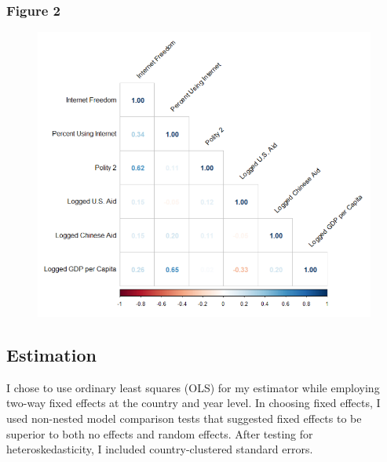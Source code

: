 \documentclass[12pt]{article}
\begin{document}
\subsubsection*{Figure 2}
\begin{figure}[htbp]
    \includegraphics[scale=0.7]{Figures/628plot3.png}
\end{figure}

\subsection*{Estimation}
I chose to use ordinary least squares (OLS) for my estimator while employing two-way fixed effects at the country and year level. In choosing fixed effects, I used non-nested model comparison tests that suggested fixed effects to be superior to both no effects and random effects. After testing for heteroskedasticity, I included country-clustered standard errors. %

\pagebreak
\end{document}
